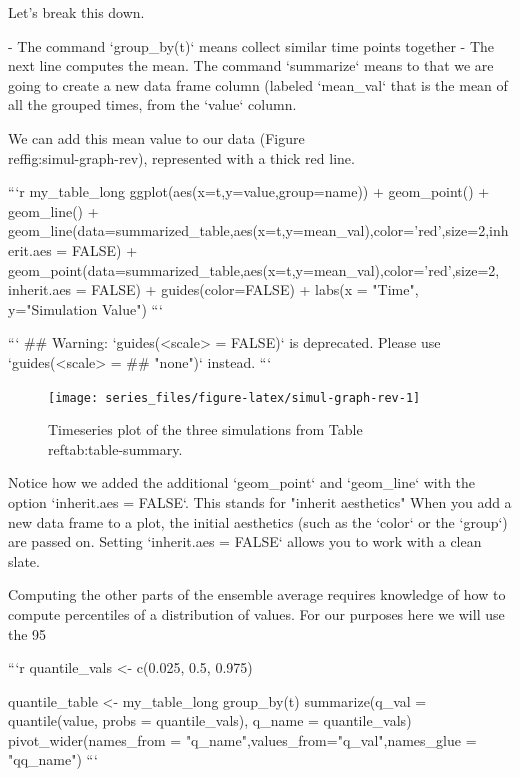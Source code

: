\documentclass[
]{book}
\theoremstyle{definition}
\theoremstyle{definition}
\theoremstyle{definition}
\theoremstyle{remark}
\begin{document}
Let's break this down.  

- The command `group_by(t)` means collect similar time points together
- The next line computes the mean.  The command `summarize` means to that we are going to create a new data frame column (labeled `mean_val` that is the mean of all the grouped times, from the `value` column.

We can add this mean value to our data (Figure \\ref{fig:simul-graph-rev}), represented with a thick red line.


```r
my_table_long %
  ggplot(aes(x=t,y=value,group=name)) +
  geom_point() +
  geom_line() +
  geom_line(data=summarized_table,aes(x=t,y=mean_val),color='red',size=2,inherit.aes = FALSE) +
  geom_point(data=summarized_table,aes(x=t,y=mean_val),color='red',size=2, inherit.aes = FALSE) +
  guides(color=FALSE) +
  labs(x = "Time", y="Simulation Value")
```

```
## Warning: `guides(<scale> = FALSE)` is deprecated. Please use `guides(<scale> =
## "none")` instead.
```

\begin{figure}

{\centering \texttt{[image: series\_files/figure-latex/simul-graph-rev-1]} 

}

\caption{Timeseries plot of the three simulations from Table \\ref{tab:table-summary}.}\label{fig:simul-graph-rev}
\end{figure}

Notice how we added the additional `geom_point` and `geom_line` with the option `inherit.aes = FALSE`. This stands for "inherit aesthetics"  When you add a new data frame to a plot, the initial aesthetics (such as the `color` or the `group`) are passed on. Setting `inherit.aes = FALSE` allows you to work with a clean slate.

Computing the other parts of the ensemble average requires knowledge of how to compute percentiles of a distribution of values. For our purposes here we will use the 95%


```r
quantile_vals <- c(0.025, 0.5, 0.975)

quantile_table <- my_table_long %
  group_by(t) %
  summarize(q_val = quantile(value,
                                probs = quantile_vals),
            q_name = quantile_vals) %
  pivot_wider(names_from = "q_name",values_from="q_val",names_glue = "q{q_name}")
```
\end{document}
